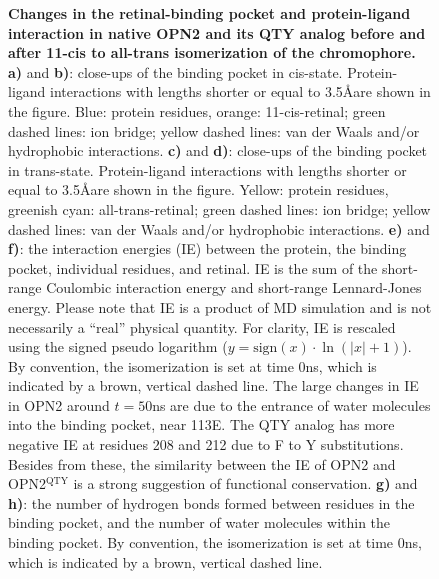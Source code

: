 \documentclass[fleqn, 10pt]{manuscript}
\begin{document}
\begin{figure}[htbp]
	\caption{\textbf{Changes in the retinal-binding pocket and protein-ligand interaction in native OPN2 and its QTY analog before and after 11-cis to all-trans isomerization of the chromophore. } \textbf{a)} and \textbf{b)}: close-ups of the binding pocket in cis-state. Protein-ligand interactions with lengths shorter or equal to 3.5\AA are shown in the figure. Blue: protein residues, orange: 11-cis-retinal; green dashed lines: ion bridge; yellow dashed lines: van der Waals and/or hydrophobic interactions. \textbf{c)} and \textbf{d)}: close-ups of the binding pocket in trans-state. Protein-ligand interactions with lengths shorter or equal to 3.5\AA are shown in the figure. Yellow: protein residues, greenish cyan: all-trans-retinal; green dashed lines: ion bridge; yellow dashed lines: van der Waals and/or hydrophobic interactions. \textbf{e)} and \textbf{f)}: the interaction energies (IE) between the protein, the binding pocket, individual residues, and retinal. IE is the sum of the short-range Coulombic interaction energy and short-range Lennard-Jones energy. Please note that IE is a product of MD simulation and is not necessarily a ``real'' physical quantity. For clarity, IE is rescaled using the signed pseudo logarithm ($y = \textrm{sign}(x)\cdot\ln(|x|+1)$). By convention, the isomerization is set at time 0ns, which is indicated by a brown, vertical dashed line. The large changes in IE in OPN2 around $t=50$ns are due to the entrance of water molecules into the binding pocket, near 113E. The QTY analog has more negative IE at residues 208 and 212 due to F to Y substitutions. Besides from these, the similarity between the IE of OPN2 and OPN2$^{\textrm{QTY}}$ is a strong suggestion of functional conservation. \textbf{g)} and \textbf{h)}: the number of hydrogen bonds formed between residues in the binding pocket, and the number of water molecules within the binding pocket. By convention, the isomerization is set at time 0ns, which is indicated by a brown, vertical dashed line. }
	\label{fig:binding}
\end{figure}
\end{document}

